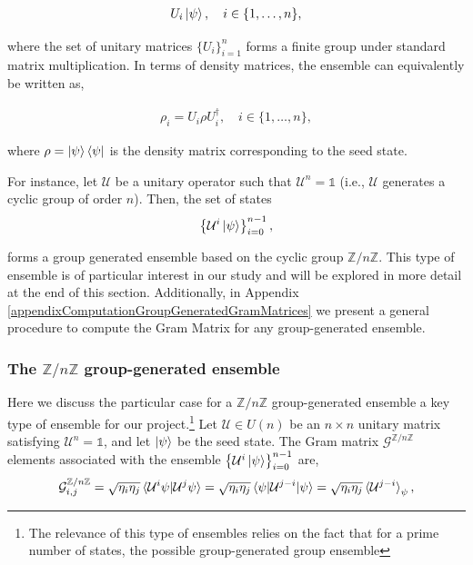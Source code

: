 \documentclass[12pt,letterpaper]{article}
\begin{document}
\begin{align*}
	U_i\ket{\psi}, \quad i \in \{1, \dots, n\},
\end{align*}

where the set of unitary matrices $\{U_i\}_{i=1}^n$ forms a finite group under standard matrix multiplication. In terms of density matrices, the ensemble can equivalently be written as,

\begin{align*}
	\rho_i = U_i \rho U_i^\dagger, \quad i \in \{1, \dots, n\},
\end{align*}

where $\rho = \ket{\psi}\bra{\psi}$ is the density matrix corresponding to the seed state.

For instance, let $\mathcal{U}$ be a unitary operator such that $\mathcal{U}^n = \mathds{1}$ (i.e., $\mathcal{U}$ generates a cyclic group of order $n$). Then, the set of states
\begin{align*}
	\left\{ \mathcal{U}^i\ket{\psi} \right\}_{i=0}^{n-1},
\end{align*}

forms a group generated ensemble based on the cyclic group $\mathbb{Z}/n\mathbb{Z}$. This type of ensemble is of particular interest in our study and will be explored in more detail at the end of this section. Additionally, in Appendix \ref{appendixComputationGroupGeneratedGramMatrices} we present a general procedure to compute the Gram Matrix for any group-generated ensemble.

\subsubsection*{The $\mathbb{Z}/n\mathbb{Z}$ group-generated ensemble}

\hspace{20pt}Here we discuss the particular case for a $\mathbb{Z}/n\mathbb{Z}$ group-generated ensemble a key type of ensemble for our project.\footnote{The relevance of this type of ensembles relies on the fact that for a prime number of states, the possible group-generated group ensemble } Let $\mathcal{U} \in U(n)$ be an $n \times n$ unitary matrix satisfying $\mathcal{U}^n = \mathds{1}$, and let $\ket{\psi}$ be the seed state. The Gram matrix $\mathcal{G}^{\mathbb{Z}/n\mathbb{Z}}$ elements associated with the ensemble $\left\{\mathcal{U}^i\ket{\psi}\right\}_{i=0}^{n-1}$ are,
\begin{align*}
	\mathcal{G}^{\mathbb{Z}/n\mathbb{Z}}_{i,j} = \sqrt{\eta_i \eta_j}\braket{\mathcal{U}^i\psi | \mathcal{U}^j\psi} = \sqrt{\eta_i \eta_j}\braket{\psi | \mathcal{U}^{j-i} | \psi} = \sqrt{\eta_i \eta_j}\braket{\mathcal{U}^{j-i}}_{\psi},
\end{align*}
\end{document}
